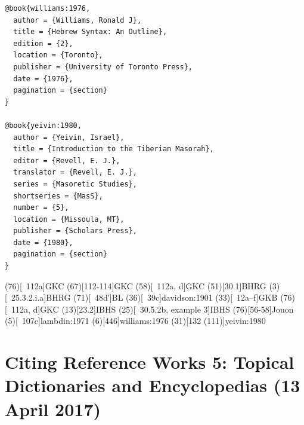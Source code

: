 \documentclass[a4paper]{article}
\begin{document}
\begin{verbatim}
@book{williams:1976,
  author = {Williams, Ronald J},
  title = {Hebrew Syntax: An Outline},
  edition = {2},
  location = {Toronto},
  publisher = {University of Toronto Press},
  date = {1976},
  pagination = {section}
}

@book{yeivin:1980,
  author = {Yeivin, Israel},
  title = {Introduction to the Tiberian Masorah},
  editor = {Revell, E. J.},
  translator = {Revell, E. J.},
  series = {Masoretic Studies},
  shortseries = {MasS},
  number = {5},
  location = {Missoula, MT},
  publisher = {Scholars Press},
  date = {1980},
  pagination = {section}
}
\end{verbatim}

\examplecite(76)[\pno 112a]{GKC}
\examplecite(67)[112-114]{GKC}
\examplecite(58)[\pno 112a, d]{GKC}
\examplecite(51)[30.1]{BHRG}
\examplecite(3)[\pno 25.3.2.i.a]{BHRG}
\examplecite(71)[\pno 48d′]{BL}
\examplecite(36)[\pno 39c]{davidson:1901}
\examplecite(33)[\pno 12a--f]{GKB}
\examplecite(76)[\pno 112a, d]{GKC}
\examplecite(13)[23.2]{IBHS}
\examplecite(25)[\pno 30.5.2b, example 3]{IBHS}
\examplecite(76)[56-58]{Jouon}
\examplecite(5)[\pno 107c]{lambdin:1971}
\examplecite(6)[446]{williams:1976}
\examplecite(31)[132 \mkbibparens{111}]{yeivin:1980}
\exampleabbreviations
\examplebibliography
{}

\section{Citing Reference Works 5: Topical Dictionaries and Encyclopedias (13 April 2017)}
\end{document}
